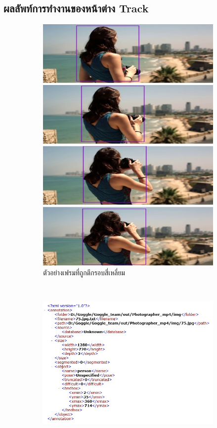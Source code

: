 \subsection*{ผลลัพท์การทำงานของหน้าต่าง Track}
\begin{figure}[!ht]
    \centering
   \begin{subfigure}[b]{0.4\linewidth}
      \includegraphics[width=\linewidth]{chapter4/images/Result/result_select6.jpg}
      \caption{ตัวอย่างเฟรมที่ถูกตีกรอบสี่เหลี่ยม}
    \end{subfigure}
\\
    \begin{subfigure}[b]{0.7\linewidth}
      \includegraphics[width=\linewidth]{chapter4/images/Result/result_select7.jpg}

\end{subfigure}
\end{figure}

